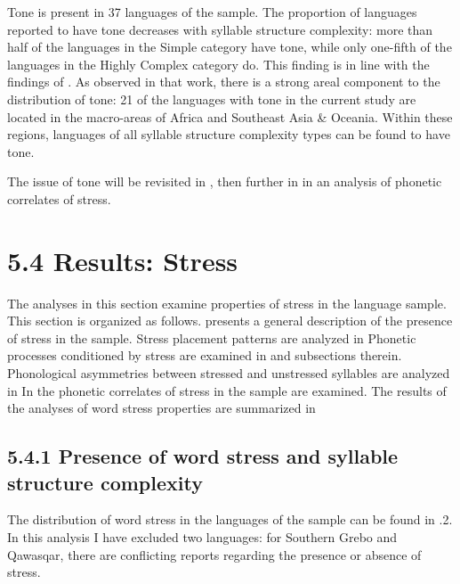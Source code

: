   Tone is present in 37 languages of the sample. The proportion of languages reported to have tone decreases with syllable structure complexity: more than half of the languages in the Simple category have tone, while only one-fifth of the languages in the Highly Complex category do. This finding is in line with the findings of \citet{Maddieson2013d}. As observed in that work, there is a strong areal component to the distribution of tone: 21 of the languages with tone in the current study are located in the macro-areas of Africa and Southeast Asia \& Oceania. Within these regions, languages of all syllable structure complexity types can be found to have tone.

  The issue of tone will be revisited in , then further in  in an analysis of phonetic correlates of stress.

\section{5.4 Results: Stress}

  The analyses in this section examine properties of stress in the language sample. This section is organized as follows.  presents a general description of the presence of stress in the sample. Stress placement patterns are analyzed in  Phonetic processes conditioned by stress are examined in  and subsections therein. Phonological asymmetries between stressed and unstressed syllables are analyzed in  In  the phonetic correlates of stress in the sample are examined. The results of the analyses of word stress properties are summarized in 

\subsection{5.4.1 Presence of word stress and syllable structure complexity}

  The distribution of word stress in the languages of the sample can be found in .2. In this analysis I have excluded two languages: for Southern Grebo and Qawasqar, there are conflicting reports regarding the presence or absence of stress.

